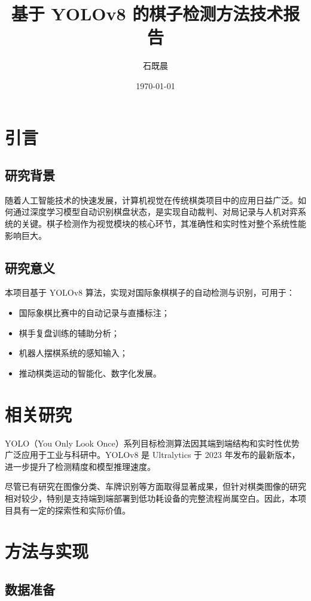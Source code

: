 \documentclass[UTF8,zihao=-4]{oucart}
\title{基于 YOLOv8 的棋子检测方法技术报告}
\author{石既晨}
\date{\today}
\begin{document}
\maketitle
\tableofcontents
\newpage

\section{引言}

\subsection{研究背景}
随着人工智能技术的快速发展，计算机视觉在传统棋类项目中的应用日益广泛。如何通过深度学习模型自动识别棋盘状态，是实现自动裁判、对局记录与人机对弈系统的关键。棋子检测作为视觉模块的核心环节，其准确性和实时性对整个系统性能影响巨大。

\subsection{研究意义}
本项目基于 YOLOv8 算法，实现对国际象棋棋子的自动检测与识别，可用于：

\begin{itemize}
    \item 国际象棋比赛中的自动记录与直播标注；
    \item 棋手复盘训练的辅助分析；
    \item 机器人摆棋系统的感知输入；
    \item 推动棋类运动的智能化、数字化发展。
\end{itemize}

\section{相关研究}

YOLO（You Only Look Once）系列目标检测算法因其端到端结构和实时性优势广泛应用于工业与科研中。YOLOv8 是 Ultralytics 于 2023 年发布的最新版本，进一步提升了检测精度和模型推理速度。

尽管已有研究在图像分类、车牌识别等方面取得显著成果，但针对棋类图像的研究相对较少，特别是支持端到端部署到低功耗设备的完整流程尚属空白。因此，本项目具有一定的探索性和实际价值。

\section{方法与实现}

\subsection{数据准备}
\end{document}
